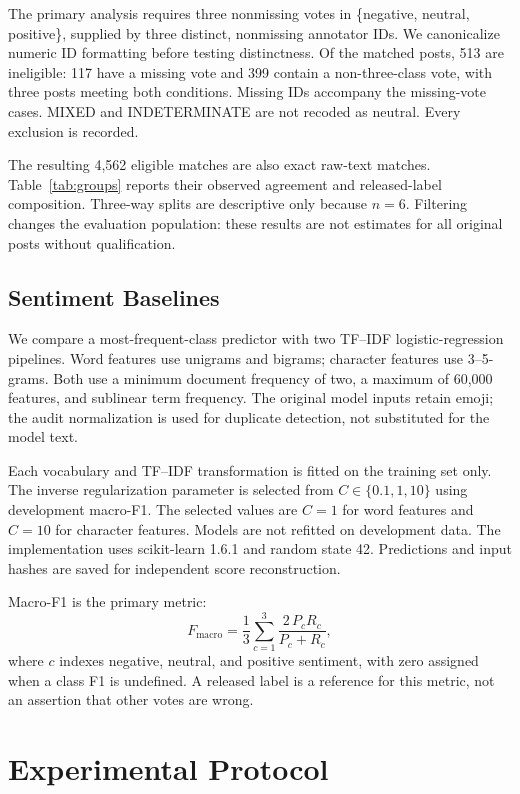 \documentclass[conference]{IEEEtran}
\begin{document}
The primary analysis requires three nonmissing votes in
\{negative, neutral, positive\}, supplied by three distinct, nonmissing
annotator IDs. We canonicalize numeric ID formatting before testing
distinctness. Of the matched posts, 513 are ineligible: 117 have a missing
vote and 399 contain a non-three-class vote, with three posts meeting both
conditions. Missing IDs accompany the missing-vote cases. MIXED and
INDETERMINATE are not recoded as neutral. Every exclusion is recorded.

The resulting 4,562 eligible matches are also exact raw-text matches.
Table~\ref{tab:groups} reports their observed agreement and released-label
composition. Three-way splits are descriptive only because $n=6$.
Filtering changes the evaluation population: these results are not estimates
for all original posts without qualification.



\subsection{Sentiment Baselines}
We compare a most-frequent-class predictor with two TF--IDF logistic-regression
pipelines. Word features use unigrams and bigrams; character features use
3--5-grams. Both use a minimum document frequency of two, a maximum of
60,000 features, and sublinear term frequency.
The original model inputs retain emoji; the audit normalization is used
for duplicate detection, not substituted for the model text.

Each vocabulary and TF--IDF transformation is fitted on the training set
only. The inverse regularization parameter is selected from
$C\in\{0.1,1,10\}$ using development macro-F1. The selected values are
$C=1$ for word features and $C=10$ for character features.
Models are not refitted on development data. The implementation uses
scikit-learn 1.6.1 and random state 42. Predictions and input hashes are
saved for independent score reconstruction.

Macro-F1 is the primary metric:
\begin{equation}
F_{\mathrm{macro}} =
\frac{1}{3}\sum_{c=1}^{3}
\frac{2\,P_c R_c}{P_c+R_c},
\end{equation}
where $c$ indexes negative, neutral, and positive sentiment, with zero assigned
when a class F1 is undefined.
A released label is a reference for this metric, not an assertion that other
votes are wrong.

\section{Experimental Protocol}
\end{document}
